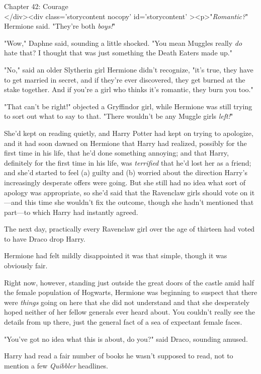 
Chapter 42: Courage\\
</div><div  class='storycontent nocopy' id='storycontent' 
><p>"\emph{Romantic?}" Hermione said. "They're both \emph{boys!}"

"Wow," Daphne said, sounding a little shocked. "You mean Muggles really 
\emph{do} hate that? I thought that was just something the Death Eaters made 
up."

"No," said an older Slytherin girl Hermione didn't recognize, "it's true, they 
have to get married in secret, and if they're ever discovered, they get burned 
at the stake together. And if you're a girl who thinks it's romantic, they burn 
you too."

"That can't be right!" objected a Gryffindor girl, while Hermione was still 
trying to sort out what to say to that. "There wouldn't be any Muggle girls 
\emph{left!}"

She'd kept on reading quietly, and Harry Potter had kept on trying to 
apologize, and it had soon dawned on Hermione that Harry had realized, possibly 
for the first time in his life, that he'd done something annoying; and that 
Harry, definitely for the first time in his life, was \emph{terrified} that 
he'd lost her as a friend; and she'd started to feel (a) guilty and (b) worried 
about the direction Harry's increasingly desperate offers were going. But she 
still had no idea what sort of apology was appropriate, so she'd said that the 
Ravenclaw girls should vote on it---and this time she wouldn't fix the outcome, 
though she hadn't mentioned that part---to which Harry had instantly agreed.

The next day, practically every Ravenclaw girl over the age of thirteen had 
voted to have Draco drop Harry.

Hermione had felt mildly disappointed it was that simple, though it was 
obviously fair.

Right now, however, standing just outside the great doors of the castle amid 
half the female population of Hogwarts, Hermione was beginning to suspect that 
there were \emph{things} going on here that she did not understand and that she 
desperately hoped neither of her fellow generals ever heard about.
\sbreak
You couldn't really see the details from up there, just the general fact of a 
sea of expectant female faces.

"You've got no idea what this is about, do you?" said Draco, sounding amused.

Harry had read a fair number of books he wasn't supposed to read, not to 
mention a few \emph{Quibbler} headlines.

